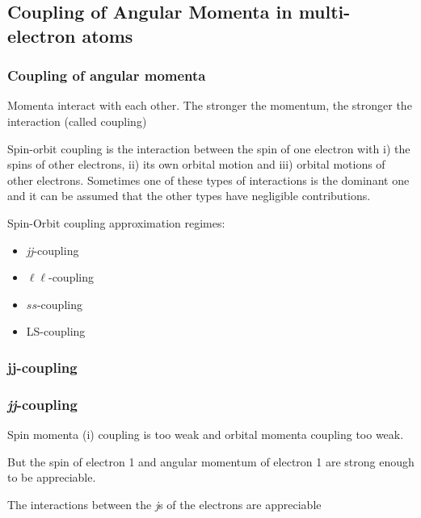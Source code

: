 \documentclass[a4paper,titlepage]{article}
\begin{document}
\subsection{Coupling of Angular Momenta in multi-electron atoms}

\begin{frame}
\frametitle{Coupling of angular momenta}
Momenta interact with each other.\newline\bigskip
The stronger the momentum, the stronger the interaction (called coupling)

Spin-orbit coupling is the interaction between the spin of one electron with i) the spins of other electrons, ii) its own orbital motion and iii) orbital motions of other electrons. Sometimes one of these types of interactions is the dominant one and it can be assumed that the other types have negligible contributions.
\par\bigskip
Spin-Orbit coupling approximation regimes:
\begin{itemize}
\item \textit{jj}-coupling 
\item \(\ell\ell\)-coupling 
\item \(ss\)-coupling
\item LS-coupling
\end{itemize}
\end{frame}

\subsubsection{jj-coupling}
\begin{frame}
\frametitle{\textit{jj}-coupling}
Spin momenta (i) coupling is too weak and orbital momenta coupling too weak. 

\medskip But the spin of electron 1 and angular momentum of electron 1 are strong enough to be appreciable. 

\medskip The interactions between the \textit{j}s of the electrons are appreciable
\end{frame}
\end{document}
